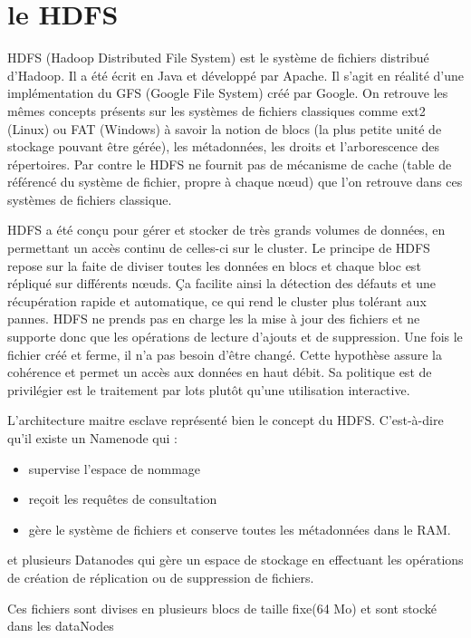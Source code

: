 \section{le HDFS}
HDFS (Hadoop Distributed File System) est le système de fichiers distribué d’Hadoop. Il a été écrit en Java et développé par Apache. Il s’agit en réalité d’une implémentation du GFS (Google File System) créé par Google. On retrouve les mêmes concepts présents sur les systèmes de fichiers classiques comme ext2 (Linux) ou FAT (Windows) à savoir la notion de blocs (la plus petite unité de stockage pouvant être gérée), les métadonnées, les droits et l’arborescence des répertoires. Par contre le HDFS ne fournit pas de mécanisme de cache (table de référencé du système de fichier, propre à chaque nœud) que l’on retrouve dans ces systèmes de fichiers classique.

HDFS a été conçu pour gérer et stocker de très grands volumes de données, en permettant un accès continu de celles-ci sur le cluster. Le principe de HDFS repose sur la faite de diviser toutes les données en blocs et chaque bloc est répliqué sur différents nœuds. Ça facilite ainsi la détection des défauts et une récupération rapide et automatique, ce qui rend le cluster plus tolérant aux pannes. HDFS ne prends pas en charge les la mise à jour des fichiers et ne supporte donc que les opérations de lecture d’ajouts et de suppression. Une fois le fichier créé et ferme, il n’a pas besoin d’être changé. Cette hypothèse assure la cohérence et permet un accès aux données en haut débit. Sa politique est de privilégier est le traitement par lots plutôt qu’une utilisation interactive.


L’architecture maitre esclave représenté bien le concept du HDFS. C’est-à-dire qu’il existe un Namenode qui :
\begin{itemize}
    \item supervise l’espace de nommage
    \item reçoit les requêtes de consultation
    \item gère le système de fichiers et conserve toutes les métadonnées dans le RAM. 
\end{itemize}
et plusieurs Datanodes qui gère un espace de stockage en effectuant les opérations de création de réplication ou de suppression de fichiers.

Ces fichiers sont divises en plusieurs blocs de taille fixe(64 Mo) et sont stocké dans les dataNodes
